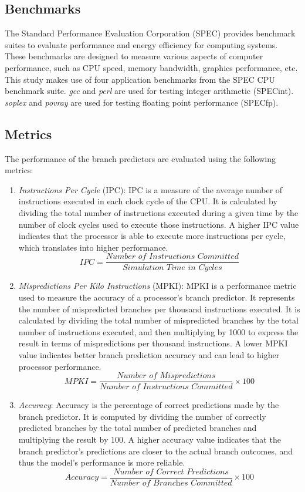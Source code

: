 \documentclass[conference]{IEEEtran}
\begin{document}
\subsection{Benchmarks} \label{ssec:benchmarks}
The Standard Performance Evaluation Corporation (SPEC) provides benchmark suites to evaluate performance and energy efficiency for computing systems. These benchmarks are designed to measure various aspects of computer performance, such as CPU speed, memory bandwidth, graphics performance, etc. This study makes use of four application benchmarks from the SPEC CPU benchmark suite. \textit{gcc} and \textit{perl} are used for testing integer arithmetic (SPECint). \textit{soplex} and \textit{povray} are used for testing floating point performance (SPECfp).

\subsection{Metrics} \label{ssec:metrics}
The performance of the branch predictors are evaluated using the following metrics:\\ 
\begin{enumerate}
    \item \textit{Instructions Per Cycle} (IPC): IPC is a measure of the average number of instructions executed in each clock cycle of the CPU. It is calculated by dividing the total number of instructions executed during a given time by the number of clock cycles used to execute those instructions. A higher IPC value indicates that the processor is able to execute more instructions per cycle, which translates into higher performance.
    $$
        IPC = \frac{\textit{Number of Instructions Committed}}{\textit{Simulation Time in Cycles}}
    $$
    \item \textit{Mispredictions Per Kilo Instructions} (MPKI): MPKI is a performance metric used to measure the accuracy of a processor's branch predictor. It represents the number of mispredicted branches per thousand instructions executed. It is calculated by dividing the total number of mispredicted branches by the total number of instructions executed, and then multiplying by 1000 to express the result in terms of mispredictions per thousand instructions. A lower MPKI value indicates better branch prediction accuracy and can lead to higher processor performance.
    $$
    MPKI = \frac{\textit{Number of Mispredictions}}{\textit{Number of Instructions Committed}} \times 100
    $$
    \item \textit{Accuracy}: Accuracy is the percentage of correct predictions made by the branch predictor. It is computed by dividing the number of correctly predicted branches by the total number of predicted branches and multiplying the result by 100. A higher accuracy value indicates that the branch predictor's predictions are closer to the actual branch outcomes, and thus the model's performance is more reliable.
    $$
        Accuracy = \frac{\textit{Number of Correct Predictions}}{\textit{Number of Branches Committed}} \times 100
    $$
\end{enumerate}
\end{document}
